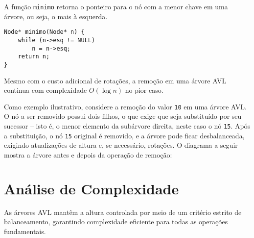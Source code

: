 A função \texttt{minimo} retorna o ponteiro para o nó com a menor chave em uma árvore, ou seja, o mais à esquerda.

\begin{lstlisting}
Node* minimo(Node* n) {
    while (n->esq != NULL)
        n = n->esq;
    return n;
}
\end{lstlisting}

Mesmo com o custo adicional de rotações, a remoção em uma árvore AVL continua com complexidade $O(\log n)$ no pior caso.

Como exemplo ilustrativo, considere a remoção do valor \texttt{10} em uma árvore AVL. 
O nó a ser removido possui dois filhos, o que exige que seja substituído por seu sucessor -- isto é, o menor elemento da subárvore direita, neste caso o nó \texttt{15}. 
Após a substituição, o nó \texttt{15} original é removido, e a árvore pode ficar desbalanceada, exigindo atualizações de altura e, se necessário, rotações. O diagrama a seguir mostra a árvore antes e depois da operação de remoção:

\begin{center}
\end{center}


\section{Análise de Complexidade}

As árvores AVL mantêm a altura controlada por meio de um critério estrito de balanceamento, garantindo complexidade eficiente para todas as operações fundamentais.


